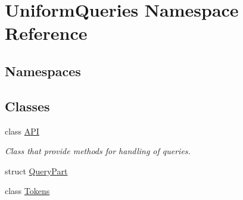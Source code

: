 \hypertarget{namespace_uniform_queries}{}\section{Uniform\+Queries Namespace Reference}
\label{namespace_uniform_queries}
\subsection*{Namespaces}
\begin{DoxyCompactItemize}
\end{DoxyCompactItemize}
\subsection*{Classes}
\begin{DoxyCompactItemize}
\item 
class \mbox{\hyperlink{class_uniform_queries_1_1_a_p_i}{A\+PI}}
\begin{DoxyCompactList}\small\item\em Class that provide methods for handling of queries. \end{DoxyCompactList}\item 
struct \mbox{\hyperlink{struct_uniform_queries_1_1_query_part}{Query\+Part}}
\item 
class \mbox{\hyperlink{class_uniform_queries_1_1_tokens}{Tokens}}
\end{DoxyCompactItemize}
